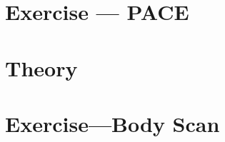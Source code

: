 \documentclass{beamer}
\begin{document}


\section{Exercise --- PACE}



\section{Theory}


\section{Exercise---Body Scan}
\end{document}
